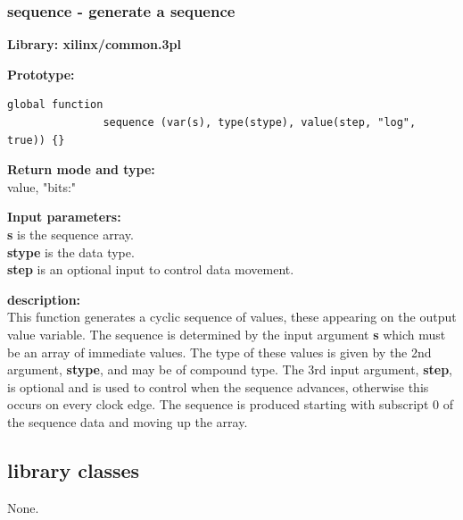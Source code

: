         \subsubsection{sequence - generate a sequence}\label{sec:lfsequence}
            
            {\bf Library: xilinx/common.3pl}

            {\bf Prototype:} \\
            \vsp
            \begin{lstlisting}[gobble=12, language=threepl]
               global function
               sequence (var(s), type(stype), value(step, "log", true)) {}
            \end{lstlisting}

            {\bf Return mode and type:} \\
            value, "bits:"

            {\bf Input parameters:} \\            
            {\bf s} is the sequence array.\\
            {\bf stype} is the data type.\\
            {\bf step} is an optional input to control data movement.

            {\bf description:} \\
            This function generates a cyclic sequence of values, these
            appearing on the output value variable. The sequence is
            determined by the input argument {\bf s} which must be an array
            of immediate values. The type of these values is given by the 2nd
            argument, {\bf stype}, and may be of compound type. The 3rd input
            argument, {\bf step}, is optional and is used to control when the
            sequence advances, otherwise this occurs on every clock edge.
            The sequence is produced starting with subscript 0 of the sequence
            data and moving up the array.




    \subsection{library classes}
    
        None.









